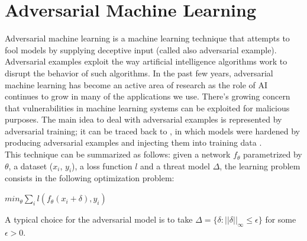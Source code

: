 \documentclass{article}
\begin{document}
\section{Adversarial Machine Learning}
Adversarial machine learning is a machine learning technique that attempts to
fool models by supplying deceptive input (called also adversarial example).
Adversarial examples exploit the way artificial intelligence algorithms work to
disrupt the behavior of such algorithms. In the past few years, adversarial
machine learning has become an active area of research as the role of AI
continues to grow in many of the applications we use. There’s growing concern
that vulnerabilities in machine learning systems can be exploited for malicious
purposes. The main idea to deal with adversarial examples is represented by
adversarial training; it can be traced back to \cite{GoodfellowEtAl2015}, in
which models were hardened by producing adversarial examples and injecting them
into training data \cite{ShafahiEtAl2019b}.\\
This technique can be summarized as follows: given a network $f_{\theta}$
parametrized by $\theta$, a dataset ($x_i$, $y_i$), a loss function $l$ and a
threat model $\Delta$, the learning problem consists in the following
optimization problem:
\begin{center}
	$min_{\theta}{\sum_{i}l(f_{\theta}(x_i + \delta), y_i)}$
\end{center}
A typical choice for the adversarial model is to take $\Delta = \{\delta :
||\delta||_{\infty} \le \epsilon\}$ for some $\epsilon > 0$.
\end{document}
